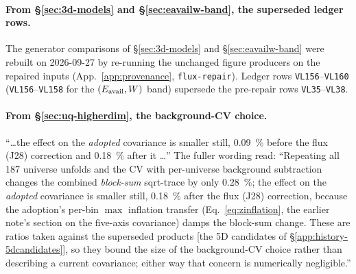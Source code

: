 %

\paragraph{From \S\ref{sec:3d-models} and \S\ref{sec:eavailw-band}, the superseded ledger rows.} The generator comparisons of \S\ref{sec:3d-models} and \S\ref{sec:eavailw-band} were rebuilt on 2026-09-27 by re-running the unchanged figure producers on the repaired inputs (App.~\ref{app:provenance}, \texttt{flux-repair}). Ledger rows \texttt{VL156}--\texttt{VL160} (\texttt{VL156}--\texttt{VL158} for the $(E_{\mathrm{avail}},W)$ band) supersede the pre-repair rows \texttt{VL35}--\texttt{VL38}.

\paragraph{From \S\ref{sec:uq-higherdim}, the background-CV choice.} ``\ldots the effect on the \emph{adopted} covariance is smaller still, \SI{0.09}{\percent} before the flux (J28) correction and \SI{0.18}{\percent} after it \ldots'' The fuller wording read: ``Repeating all 187 universe unfolds and the CV with per-universe background subtraction changes the combined \emph{block-sum} sqrt-trace by only \SI{0.28}{\percent}; the effect on the \emph{adopted} covariance is smaller still, \SI{0.18}{\percent} after the flux (J28) correction, because the adoption's per-bin $\max$ inflation transfer (Eq.~\eqref{eq:zinflation}, the earlier note's section on the five-axis covariance) damps the block-sum change. These are ratios taken against the superseded products [the 5D candidates of \S\ref{app:history-5dcandidates}], so they bound the size of the background-CV choice rather than describing a current covariance; either way that concern is numerically negligible.''
